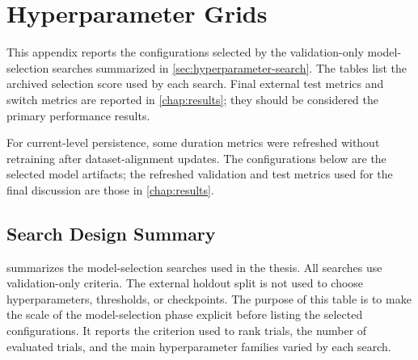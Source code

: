 \chapter{Hyperparameter Grids}
\label{app:hyperparameter-grids}

This appendix reports the configurations selected by the validation-only
model-selection searches summarized in \cref{sec:hyperparameter-search}. The
tables list the archived selection score used by each search. Final external
test metrics and switch metrics are reported in \cref{chap:results}; they should
be considered the primary performance results.

For current-level persistence, some duration metrics were refreshed without
retraining after dataset-alignment updates. The configurations below are the
selected model artifacts; the refreshed validation and test metrics used for
the final discussion are those in \cref{chap:results}.

\section{Search Design Summary}

 summarizes the model-selection
searches used in the thesis. All searches use validation-only criteria. The
external holdout split is not used to choose hyperparameters, thresholds, or
checkpoints.
The purpose of this table is to make the scale of the model-selection phase
explicit before listing the selected configurations. It reports the criterion
used to rank trials, the number of evaluated trials, and the main
hyperparameter families varied by each search.


